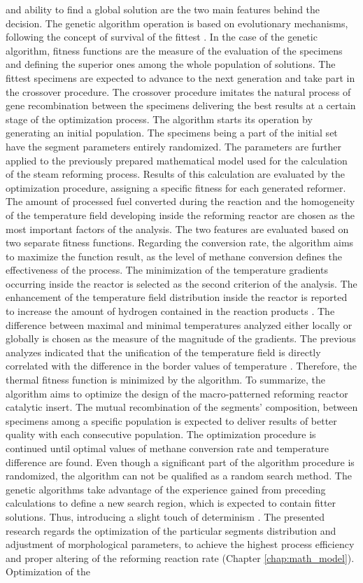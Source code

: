 and ability to find a global solution are the two main features behind the decision. The genetic algorithm operation is based on evolutionary mechanisms, following the concept of survival of the fittest \cite{Goldberg1989}. In the case of the genetic algorithm, fitness functions are the measure of the evaluation of the specimens and defining the superior ones among the whole population of solutions. The fittest specimens are expected to advance to the next generation and take part in the crossover procedure. The crossover procedure imitates the natural process of gene recombination between the specimens delivering the best results at a certain stage of the optimization process. The algorithm starts its operation by generating an initial population. The specimens being a part of the initial set have the segment parameters entirely randomized. The parameters are further applied to the previously prepared mathematical model used for the calculation of the steam reforming process. Results of this calculation are evaluated by the optimization procedure, assigning a specific fitness for each generated reformer. The amount of processed fuel converted during the reaction and the homogeneity of the temperature field developing inside the reforming reactor are chosen as the most important factors of the analysis. The two features are evaluated based on two separate fitness functions. Regarding the conversion rate, the algorithm aims to maximize the function result, as the level of methane conversion defines the effectiveness of the process. The minimization of the temperature gradients occurring inside the reactor is selected as the second criterion of the analysis. The enhancement of the temperature field distribution inside the reactor is reported to increase the amount of hydrogen contained in the reaction products \cite{Palma2017}. The difference between maximal and minimal temperatures analyzed either locally or globally is chosen as the measure of the magnitude of the gradients.  The previous analyzes indicated that the unification of the temperature field is directly correlated with the difference in the border values of temperature \cite{Pajak2018}. Therefore, the thermal fitness function is minimized by the algorithm. To summarize, the algorithm aims to optimize the design of the macro-patterned reforming reactor catalytic insert. The mutual recombination of the segments’ composition, between specimens among a specific population is expected to deliver results of better quality with each consecutive population. The optimization procedure is continued until optimal values of methane conversion rate and temperature difference are found. Even though a significant part of the algorithm procedure is randomized, the algorithm can not be qualified as a random search method. The genetic algorithms take advantage of the experience gained from preceding calculations to define a new search region, which is expected to contain fitter solutions. Thus, introducing a slight touch of determinism \cite{Goldberg1989}. The presented research regards the optimization of the particular segments distribution and adjustment of morphological parameters, to achieve the highest process efficiency and proper altering of the reforming reaction rate (Chapter \ref{chap:math_model}). Optimization of the 